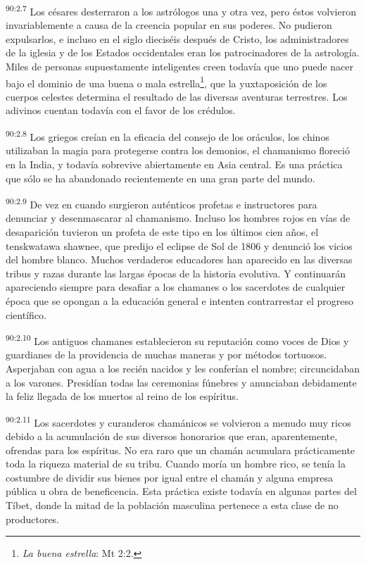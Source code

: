 \par
\textsuperscript{90:2.7} Los césares desterraron a los astrólogos una y otra vez, pero éstos volvieron invariablemente a causa de la creencia popular en sus poderes. No pudieron expulsarlos, e incluso en el siglo dieciséis después de Cristo, los administradores de la iglesia y de los Estados occidentales eran los patrocinadores de la astrología. Miles de personas supuestamente inteligentes creen todavía que uno puede nacer bajo el dominio de una buena o mala estrella\footnote{\textit{La buena estrella}: Mt 2:2.}, que la yuxtaposición de los cuerpos celestes determina el resultado de las diversas aventuras terrestres. Los adivinos cuentan todavía con el favor de los crédulos.

\par
\textsuperscript{90:2.8} Los griegos creían en la eficacia del consejo de los oráculos, los chinos utilizaban la magia para protegerse contra los demonios, el chamanismo floreció en la India, y todavía sobrevive abiertamente en Asia central. Es una práctica que sólo se ha abandonado recientemente en una gran parte del mundo.

\par
\textsuperscript{90:2.9} De vez en cuando surgieron auténticos profetas e instructores para denunciar y desenmascarar al chamanismo. Incluso los hombres rojos en vías de desaparición tuvieron un profeta de este tipo en los últimos cien años, el tenskwatawa shawnee, que predijo el eclipse de Sol de 1806 y denunció los vicios del hombre blanco. Muchos verdaderos educadores han aparecido en las diversas tribus y razas durante las largas épocas de la historia evolutiva. Y continuarán apareciendo siempre para desafiar a los chamanes o los sacerdotes de cualquier época que se opongan a la educación general e intenten contrarrestar el progreso científico.

\par
\textsuperscript{90:2.10} Los antiguos chamanes establecieron su reputación como voces de Dios y guardianes de la providencia de muchas maneras y por métodos tortuosos. Asperjaban con agua a los recién nacidos y les conferían el nombre; circuncidaban a los varones. Presidían todas las ceremonias fúnebres y anunciaban debidamente la feliz llegada de los muertos al reino de los espíritus.

\par
\textsuperscript{90:2.11} Los sacerdotes y curanderos chamánicos se volvieron a menudo muy ricos debido a la acumulación de sus diversos honorarios que eran, aparentemente, ofrendas para los espíritus. No era raro que un chamán acumulara prácticamente toda la riqueza material de su tribu. Cuando moría un hombre rico, se tenía la costumbre de dividir sus bienes por igual entre el chamán y alguna empresa pública u obra de beneficencia. Esta práctica existe todavía en algunas partes del Tíbet, donde la mitad de la población masculina pertenece a esta clase de no productores.

